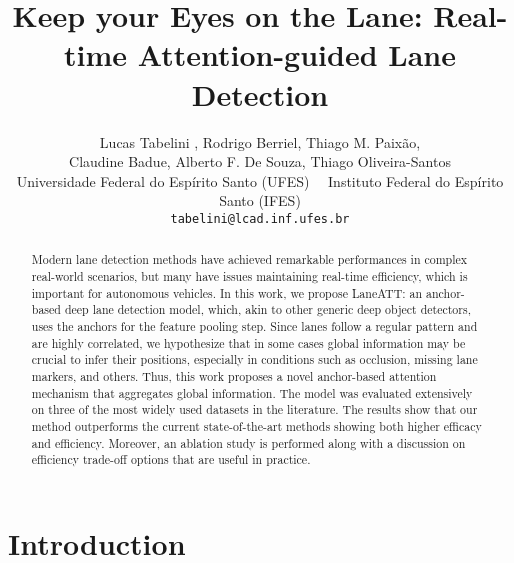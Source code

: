 \documentclass[final]{cvpr}
\begin{document}
\graphicspath{{figures/}}


\newcommand{\methodname}{LaneATT}
\newcommand\sbullet[1][.5]{\mathbin{\vcenter{\hbox{\scalebox{#1}{}}}}}



\title{Keep your Eyes on the Lane: Real-time Attention-guided Lane Detection}

\author{
	Lucas Tabelini ,  Rodrigo Berriel, Thiago M. Paixão,\\
	Claudine Badue, Alberto F. De Souza, Thiago Oliveira-Santos \vspace{0.25ex} \\
	Universidade Federal do Espírito Santo (UFES) ~~Instituto Federal do Espírito Santo (IFES)\\
    \footnotesize{\texttt{tabelini@lcad.inf.ufes.br}} \\
}


\maketitle



\begin{abstract}
Modern lane detection methods have achieved remarkable performances in complex real-world scenarios, but many have issues maintaining real-time efficiency, which is important for autonomous vehicles. In this work, we propose \methodname: an anchor-based deep lane detection model, which, akin to other generic deep object detectors, uses the anchors for the feature pooling step. Since lanes follow a regular pattern and are highly correlated, we hypothesize that in some cases global information may be crucial to infer their positions, especially in conditions such as occlusion, missing lane markers, and others. Thus, this work proposes a novel anchor-based attention mechanism that aggregates global information. The model was evaluated extensively on three of the most widely used datasets in the literature. The results show that our method outperforms the current state-of-the-art methods showing both higher efficacy and efficiency. Moreover, an ablation study is performed along with a discussion on efficiency trade-off options that are useful in practice.

\end{abstract}

\vspace{-12pt} \section{Introduction}
\end{document}
